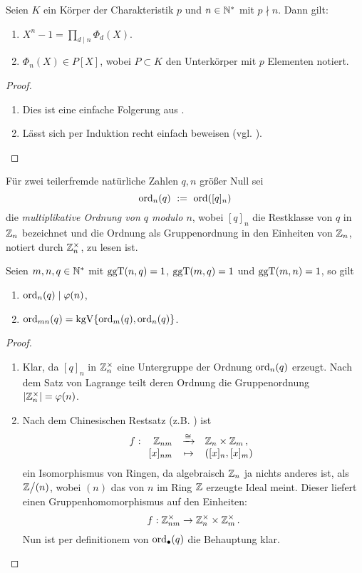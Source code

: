 \begin{satz}
  \label{satz:zerfall_xn_1}
  Seien $K$ ein Körper der Charakteristik $p$ und $n \in \mathbb{N}^\ast$ mit $p\nmid
  n$. Dann gilt:
  \begin{enumerate}
    \item $X^n-1 = \prod_{d\mid n} \Phi_d(X)$.
    \item $\Phi_n(X) \in P[X]$, wobei $P\subset K$ den Unterkörper mit $p$
      Elementen notiert.
  \end{enumerate}
\end{satz}
\begin{proof}
  \begin{enumerate}
    \item Dies ist eine einfache Folgerung aus .
    \item Lässt sich per Induktion recht einfach beweisen 
      (vgl. \autocite[Theorem 2.45 (ii)]{lidl1997finite}).
  \end{enumerate}
\end{proof}


\begin{definition}
  Für zwei teilerfremde natürliche Zahlen $q,n$ größer Null sei
  \[ \operatorname{ord}_n(q) \ :=\  \operatorname{ord}([q]_n)\]
  die \emph{multiplikative Ordnung von $q$ modulo $n$},
  wobei $[q]_n$ die Restklasse von $q$ in $\mathbb{Z}_n$ bezeichnet und 
  die Ordnung als Gruppenordnung in den Einheiten von $\mathbb{Z}_n$, notiert 
  durch $\mathbb{Z}_n^\times$, zu lesen ist.
\end{definition}

\begin{lemma}
  \label{lemma:rechenregeln_ordn}
  Seien $m,n,q \in \mathbb{N}^\ast$ mit $\operatorname{ggT}(n,q)=1$,
  $\operatorname{ggT}(m,q) = 1$ und $\operatorname{ggT}(m,n) = 1$, so gilt
  \begin{enumerate}
    \item $\operatorname{ord}_n(q) \mid \varphi(n)$,
    \item $\operatorname{ord}_{mn}(q) = \operatorname{kgV}\{ \operatorname{ord}_m(q), \operatorname{ord}_n(q)\}$.
  \end{enumerate}
\end{lemma}
\begin{proof}
  \begin{enumerate}
    \item Klar, da $[q]_n$ in $\mathbb{Z}_n^\times$ eine Untergruppe der Ordnung
      $\operatorname{ord}_n(q)$ erzeugt. 
      Nach dem Satz von Lagrange teilt deren Ordnung die 
      Gruppenordnung $|\mathbb{Z}_n^\times| = \varphi(n)$.
    \item Nach dem Chinesischen Restsatz 
      (z.B. \autocite[Kapitel 2 Satz 12]{bosch2009algebra}) ist
      \[ f: \funcdef{ \Z_{nm} &\xrightarrow{\cong}& \Z_n \times \Z_m\,,\\{} 
          [x]_{nm} &\mapsto& ([x]_n, [x]_m)}\]
      ein Isomorphismus von Ringen, 
      da algebraisch $\mathbb{Z}_n$ ja nichts anderes ist, als
      $\mathbb{Z}\big/(n)$, wobei $(n)$ das von $n$ im Ring $\mathbb{Z}$ erzeugte Ideal meint.
      Dieser liefert einen Gruppenhomomorphismus auf
      den Einheiten:
      \[ f: \mathbb{Z}_{nm}^\times \to \mathbb{Z}_n^\times \times \mathbb{Z}_m^\times\,.\]
      Nun ist per definitionem von $\operatorname{ord}_{\bullet}(q)$ die Behauptung
      klar.
  \end{enumerate}
\end{proof}

